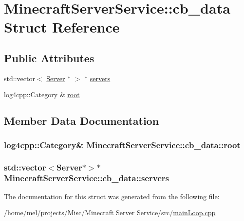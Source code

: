 \hypertarget{struct_minecraft_server_service_1_1cb__data}{}\section{Minecraft\+Server\+Service\+:\+:cb\+\_\+data Struct Reference}
\label{struct_minecraft_server_service_1_1cb__data}
\subsection*{Public Attributes}
\begin{DoxyCompactItemize}
\item 
std\+::vector$<$ \hyperlink{class_minecraft_server_service_1_1_server}{Server} $\ast$ $>$ $\ast$ \hyperlink{struct_minecraft_server_service_1_1cb__data_a87619170d590538cb5be1c9c9b40fc4c}{servers}
\item 
log4cpp\+::\+Category \& \hyperlink{struct_minecraft_server_service_1_1cb__data_a4aecabcb3cf59c471f8e19f66797cb5d}{root}
\end{DoxyCompactItemize}


\subsection{Member Data Documentation}
\subsubsection[{\texorpdfstring{root}{root}}]{\setlength{\rightskip}{0pt plus 5cm}log4cpp\+::\+Category\& Minecraft\+Server\+Service\+::cb\+\_\+data\+::root}\hypertarget{struct_minecraft_server_service_1_1cb__data_a4aecabcb3cf59c471f8e19f66797cb5d}{}\label{struct_minecraft_server_service_1_1cb__data_a4aecabcb3cf59c471f8e19f66797cb5d}
\subsubsection[{\texorpdfstring{servers}{servers}}]{\setlength{\rightskip}{0pt plus 5cm}std\+::vector$<${\bf Server}$\ast$$>$$\ast$ Minecraft\+Server\+Service\+::cb\+\_\+data\+::servers}\hypertarget{struct_minecraft_server_service_1_1cb__data_a87619170d590538cb5be1c9c9b40fc4c}{}\label{struct_minecraft_server_service_1_1cb__data_a87619170d590538cb5be1c9c9b40fc4c}


The documentation for this struct was generated from the following file\+:\begin{DoxyCompactItemize}
\item 
/home/mel/projects/\+Misc/\+Minecraft Server Service/src/\hyperlink{main_loop_8cpp}{main\+Loop.\+cpp}\end{DoxyCompactItemize}
